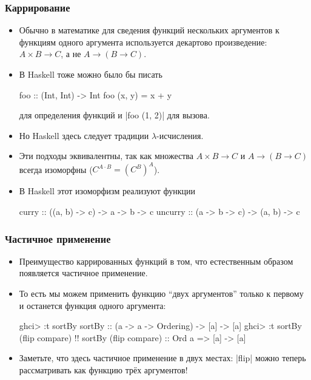 \documentclass[10pt]{beamer}
\begin{document}
\begin{frame}[fragile]
  \frametitle{Каррирование}
  \begin{itemize}
    \item Обычно в математике для сведения функций нескольких аргументов к функциям одного аргумента используется декартово произведение: $A \times B \to C$, а не $A \to (B \to C)$.\pause
    \item В Haskell тоже можно было бы писать
          \begin{haskell}
            foo :: (Int, Int) -> Int
            foo (x, y) = x + y
          \end{haskell}
          для определения функций и \haskinline|foo (1, 2)| для вызова.\pause
    \item Но Haskell здесь следует традиции $\lambda$-исчисления.\pause
    \item Эти подходы эквивалентны, так как множества $A \times B \to C$ и $A \to (B \to C)$ всегда изоморфны \pause ($C^{A \cdot B} = (C^B)^A$).
    \item В Haskell этот изоморфизм реализуют функции\pause
          \begin{haskell}
            curry :: ((a, b) -> c) -> a -> b -> c
            uncurry :: (a -> b -> c) -> (a, b) -> c
          \end{haskell}
  \end{itemize}
\end{frame}

\begin{frame}[fragile]
  \frametitle{Частичное применение}
  \begin{itemize}
    \item Преимущество каррированных функций в том, что естественным образом появляется частичное применение.
    \item То есть мы можем применить функцию \enquote{двух аргументов} только к первому и останется функция одного аргумента:
          \begin{haskell}
            ghci> :t sortBy
            sortBy :: (a -> a -> Ordering) -> [a] -> [a]
            ghci> :t sortBy (flip compare) !\pause!
            sortBy (flip compare) :: Ord a => [a] -> [a]
          \end{haskell}
          \pause
    \item Заметьте, что здесь частичное применение в двух местах: \pause\haskinline|flip| можно теперь рассматривать как функцию трёх аргументов!
  \end{itemize}
\end{frame}
\end{document}
